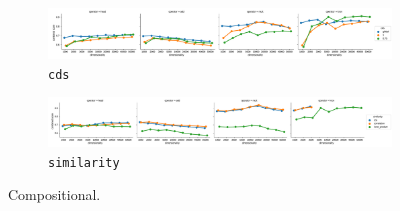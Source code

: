 \begin{figure}
  \centering

  \begin{subfigure}[t]{\textwidth}
    \includegraphics[width=1.1\textwidth]{supplement/figures/compositional-interaction-cds}

  \caption{\texttt{cds}}
  \label{fig:compositional-cds}
  \end{subfigure}

  \begin{subfigure}[t]{\textwidth}
    \includegraphics[width=1.1\textwidth]{supplement/figures/compositional-interaction-similarity}

  \caption{\texttt{similarity}}
  \label{fig:compositional-similarity}
  \end{subfigure}

  \caption{Compositional.}
\end{figure}
